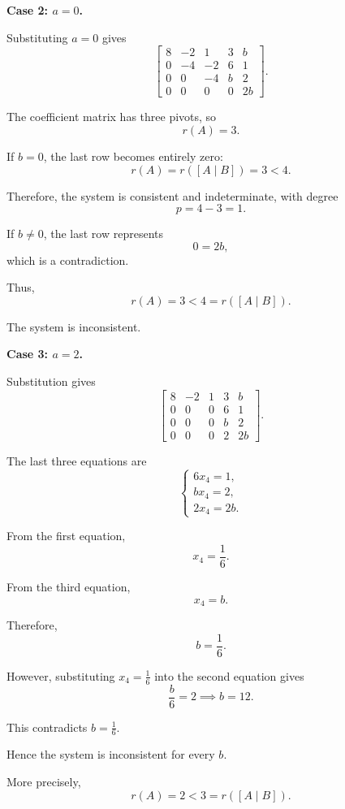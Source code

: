 \begin{enumerate}[label=\alph*)]
\begin{answer}
    \textbf{Case 2: $a=0$.}

    Substituting $a=0$ gives
    $$
    \left[
    \begin{array}{cccc|c}
    8&-2&1&3&b\\
    0&-4&-2&6&1\\
    0&0&-4&b&2\\
    0&0&0&0&2b
    \end{array}
    \right].
    $$

    The coefficient matrix has three pivots, so
    $$
    r(A)=3.
    $$

    If $b=0$, the last row becomes entirely zero:
    $$
    r(A)=r([A\mid B])=3<4.
    $$

    Therefore, the system is consistent and indeterminate, with degree
    $$
    p=4-3=1.
    $$

    If $b\neq0$, the last row represents
    $$
    0=2b,
    $$
    which is a contradiction.

    Thus,
    $$
    r(A)=3<4=r([A\mid B]).
    $$

    The system is inconsistent.

    \textbf{Case 3: $a=2$.}

    Substitution gives
    $$
    \left[
    \begin{array}{cccc|c}
    8&-2&1&3&b\\
    0&0&0&6&1\\
    0&0&0&b&2\\
    0&0&0&2&2b
    \end{array}
    \right].
    $$

    The last three equations are
    $$
    \begin{cases}
    6x_4=1,\\
    bx_4=2,\\
    2x_4=2b.
    \end{cases}
    $$

    From the first equation,
    $$
    x_4=\frac16.
    $$

    From the third equation,
    $$
    x_4=b.
    $$

    Therefore,
    $$
    b=\frac16.
    $$

    However, substituting $x_4=\frac16$ into the
    second equation gives
    $$
    \frac{b}{6}=2
    \implies b=12.
    $$

    This contradicts
    $b=\frac16$.

    Hence the system is
    inconsistent for every $b$.

    More precisely,
    $$
    r(A)=2<3=r([A\mid B]).
    $$


\end{answer}
\end{enumerate}
